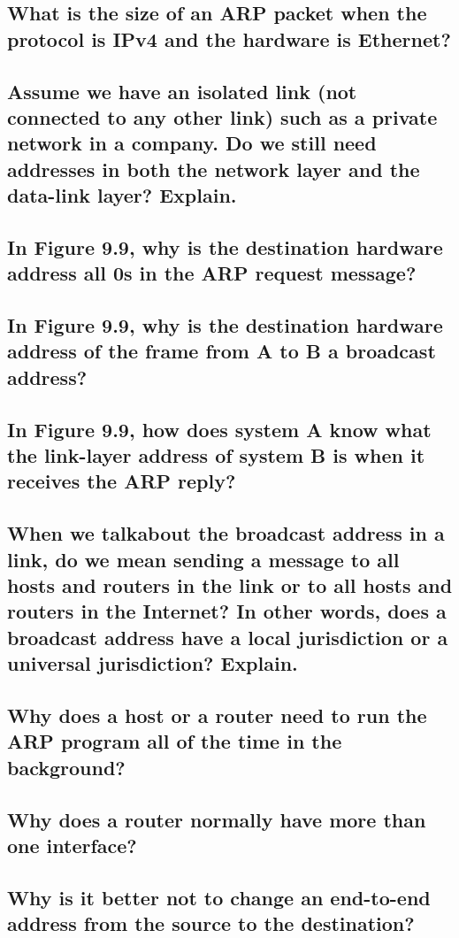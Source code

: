\documentclass{article}
\begin{document}
\subsection{
	What is the size of an ARP packet when the protocol is IPv4 and the hardware
	is Ethernet?
}
\subsection{
	Assume we have an isolated link (not connected to any other link) such as a
	private network in a company. Do we still need addresses in both the network
	layer and the data-link layer? Explain.
}
\subsection{
	In Figure 9.9, why is the destination hardware address all 0s in the ARP
	request message?
}
\subsection{
	In Figure 9.9, why is the destination hardware address of the frame from A to
	B a broadcast address?
}
\subsection{
	In Figure 9.9, how does system A know what the link-layer address of system
	B is when it receives the ARP reply?
}
\subsection{
	When we talkabout the broadcast address in a link, do we mean sending a
	message to all hosts and routers in the link or to all hosts and routers in the
	Internet? In other words, does a broadcast address have a local jurisdiction or
	a universal jurisdiction? Explain.
}
\subsection{
	Why does a host or a router need to run the ARP program all of the time in the
	background?
}
\subsection{
	Why does a router normally have more than one interface?
}
\subsection{
	Why is it better not to change an end-to-end address from the source to the
	destination?
}
\end{document}
